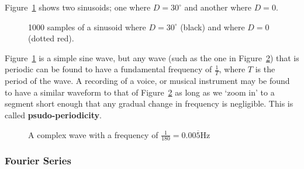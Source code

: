 Figure~\ref{fig-sinusoid} shows two sinusoids; one where $D = 30^{\circ}$ and
another where $D = 0$.

\begin{figure}
  \centering
  \label{fig-sinusoid}
  \caption{1000 samples of a sinusoid where $D = 30^{\circ}$ (black) and where
  $D = 0$ (dotted red).}
\end{figure} 

Figure~\ref{fig-sinusoid} is a simple sine wave, but any wave (such as the one
in Figure~\ref{fig-complex-wave}) that is periodic can be found to have a
fundamental frequency of $\frac{1}{T}$, where $T$ is the period of the wave. A
recording of a voice, or musical instrument may be found to have a similar
waveform to that of Figure~\ref{fig-complex-wave} as long as we `zoom in' to a
segment short enough that any gradual change in frequency is negligible. This is
called \textbf{psudo-periodicity}.

\begin{figure}
  \centering
  \label{fig-complex-wave}
  \caption{A complex wave with a frequency of
  $\frac{1}{180} = 0.00\overline{5}\si{\hertz}$}
\end{figure} 

\subsubsection{Fourier Series}

